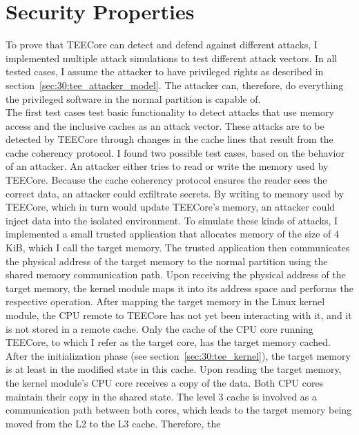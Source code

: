 \section{Security Properties}
\label{eval:sec}
To prove that TEECore can detect and defend against different attacks, I
implemented multiple attack simulations to test different attack vectors. In all
tested cases, I assume the attacker to have privileged rights as described in
section~\ref{sec:30:tee_attacker_model}. The attacker can, therefore, do
everything the privileged software in the normal partition is capable of.\\

The first test cases test basic functionality to detect attacks that use memory
access and the inclusive caches as an attack vector. These attacks are to be
detected by TEECore through changes in the cache lines that result from the
cache coherency protocol. I found two possible test cases, based on the behavior
of an attacker. An attacker either tries to read or write the memory used by
TEECore. Because the cache coherency protocol ensures the reader sees the
correct data, an attacker could exfiltrate secrets. By writing to memory used by
TEECore, which in turn would update TEECore's memory, an attacker could inject
data into the isolated environment. To simulate these kinds of attacks, I
implemented a small trusted application that allocates memory of the size of 4
KiB, which I call the target memory. The trusted application then communicates
the physical address of the target memory to the normal partition using the
shared memory communication path. Upon receiving the physical address of the
target memory, the kernel module maps it into its address space and performs the
respective operation. After mapping the target memory in the Linux kernel
module, the CPU remote to TEECore has not yet been interacting with it, and it
is not stored in a remote cache. Only the cache of the CPU core running TEECore,
to which I refer as the target core, has the target memory cached. After the
initialization phase (see section~\ref{sec:30:tee_kernel}), the target memory is
at least in the modified state in this cache. Upon reading the target memory,
the kernel module's CPU core receives a copy of the data. Both CPU cores
maintain their copy in the shared state. The level 3 cache is involved as a
communication path between both cores, which leads to the target memory
being moved from the L2 to the L3 cache. Therefore, the
